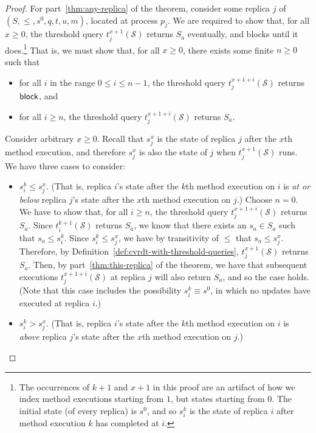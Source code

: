 \begin{proof}
For part~\ref{thm:any-replica} of the theorem, consider some replica
$j$ of $(S, \leq, s^0, q, t, u, m)$, located at process $p_j$.
We are required to show that, for all
$x \geq 0$, the threshold query $t^{x+1}_j(\mathcal{S})$ returns $S_a$ eventually, and blocks
until it does.\footnote{The occurrences of $k+1$ and $x+1$ in this
proof are an artifact of how we index method executions starting from
$1$, but states starting from $0$.  The initial state (of every
replica) is $s^0$, and so $s^k_i$ is the state of replica $i$ after method
execution $k$ has completed at $i$.}
% 
That is, we must show that, for all $x \geq 0$, there exists some
finite $n \geq 0$ such that
\begin{itemize}
\item 
for all $i$ in the range $0 \leq i \leq n-1$, the threshold query
$t^{x+1+i}_j(\mathcal{S})$ returns $\textsf{block}$, and
\item
for all $i \geq n$, the threshold query $t^{x+1+i}_j(\mathcal{S})$
returns $S_a$.
\end{itemize}
Consider arbitrary $x \geq 0$.  Recall that $s^x_j$ is the state of
replica $j$ after the $x$th method execution, and therefore $s^x_j$ is
also the state of $j$ when $t^{x+1}_j(\mathcal{S})$ runs.
%
We have three cases to consider:
\begin{itemize}
\item $s^k_i \leq s^x_j$.
(That is, replica $i$'s state after the $k$th method execution on $i$
is \emph{at or below} replica $j$'s state after the $x$th method
execution on $j$.)
%
Choose $n = 0$.  We have to show that, for all $i \geq n$, the
threshold query $t^{x+1+i}_j(\mathcal{S})$ returns $S_a$.  Since
$t^{k+1}_i(\mathcal{S})$ returns $S_a$, we know that there exists an
$s_a \in S_a$ such that $s_a \leq s^k_i$.  Since $s^k_i \leq s^x_j$,
we have by transitivity of $\leq$ that $s_a \leq s^x_j$.  Therefore,
by Definition~\ref{def:cvrdt-with-threshold-queries},
$t^{x+1}_j(\mathcal{S})$ returns $S_a$.  Then, by
part~\ref{thm:this-replica} of the theorem, we have that subsequent
executions $t^{x+1+i}_j(\mathcal{S})$ at replica $j$ will also return
$S_a$, and so the case holds.  (Note that this case includes the
possibility $s^k_i \equiv s^0$, in which no updates have executed at
replica $i$.)

\item $s^k_i > s^x_j$.
(That is, replica $i$'s state after the $k$th method execution on $i$
is \emph{above} replica $j$'s state after the $x$th method execution
on $j$.)


\end{itemize}
\end{proof}
